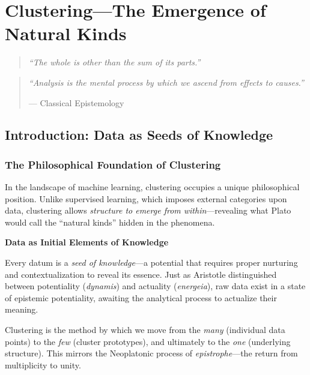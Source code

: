 \chapter{Clustering---The Emergence of Natural Kinds}

\begin{quote}
    \itshape
    ``The whole is other than the sum of its parts.''
    
\end{quote}

\begin{quote}
    \itshape
    ``Analysis is the mental process by which we ascend from effects to causes.''
    
    \raggedleft--- Classical Epistemology
\end{quote}

\section{Introduction: Data as Seeds of Knowledge}

\subsection{The Philosophical Foundation of Clustering}

In the landscape of machine learning, clustering occupies a unique philosophical position. Unlike supervised learning, which imposes external categories upon data, clustering allows \textit{structure to emerge from within}---revealing what Plato would call the ``natural kinds'' hidden in the phenomena.

\begin{philobox}
\textbf{Data as Initial Elements of Knowledge}

Every datum is a \textit{seed of knowledge}---a potential that requires proper nurturing and contextualization to reveal its essence. Just as Aristotle distinguished between potentiality (\textit{dynamis}) and actuality (\textit{energeia}), raw data exist in a state of epistemic potentiality, awaiting the analytical process to actualize their meaning.

Clustering is the method by which we move from the \textit{many} (individual data points) to the \textit{few} (cluster prototypes), and ultimately to the \textit{one} (underlying structure). This mirrors the Neoplatonic process of \textit{epistrophe}---the return from multiplicity to unity.
\end{philobox}

